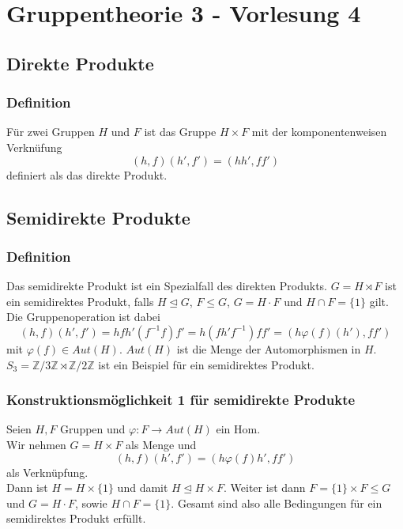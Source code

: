 \documentclass[12pt, german]{article}
\newcommand{\Z}{\mathbb{Z}}
\begin{document}
	\section{Gruppentheorie 3 - Vorlesung 4}
	\subsection{Direkte Produkte}
	\subsubsection{Definition}
	Für zwei Gruppen $H$ und $F$ ist das Gruppe $H \times F$ mit  der komponentenweisen Verknüfung $$(h,f)(h', f') = (hh', ff')$$ definiert als das direkte Produkt.
	
	\subsection{Semidirekte Produkte}
	\subsubsection{Definition}
	Das semidirekte Produkt ist ein Spezialfall des direkten Produkts.
	$G = H \rtimes F$ ist ein semidirektes Produkt, falls $H \trianglelefteq G$, $F \leq G$,  $G = H\cdot F$ und $H \cap F = \{1\}$ gilt. 
	Die Gruppenoperation ist dabei 
	$$(h,f)(h',f') = hfh'(f^{-1}f)f' = h(fh'f^{-1})ff'  = (h\varphi(f)(h'), ff')$$
	mit $\varphi(f) \in Aut(H)$.
	$Aut(H)$ ist die Menge der Automorphismen in $H$.
	\newline
	$S_3 = \Z/3\Z \rtimes \Z/2\Z$ ist ein Beispiel für ein semidirektes Produkt.
	\subsubsection{Konstruktionsmöglichkeit 1 für semidirekte Produkte}
	Seien $H, F$ Gruppen und $\varphi: F\to Aut(H)$ ein Hom. \\ 
	Wir nehmen $G = H \times F$ als Menge und $$ (h,f)(h',f') = (h\varphi(f)h', ff')$$ als Verknüpfung.\\
	Dann ist $H= H \times \{1\}$ und damit $H \trianglelefteq H \times F$. 
	Weiter ist dann $F = \{1\} \times F \leq G$ und $G= H\cdot F$, sowie $H\cap F = \{1\}$.
	Gesamt sind also alle Bedingungen für ein semidirektes Produkt erfüllt.
	
\end{document}
